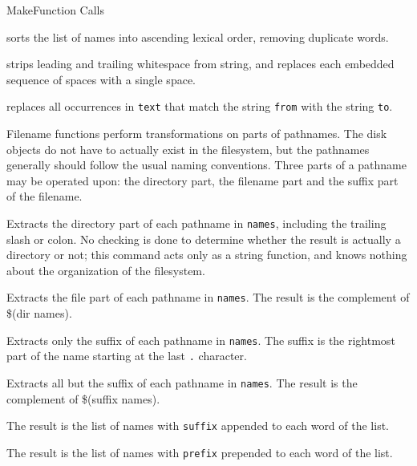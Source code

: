 \begin{manpage}{Make}{Function Calls}{}
\newpage
\separator
{}

sorts the list of names into ascending lexical order, removing duplicate
words.

\separator
{}

strips leading and trailing whitespace from string, and replaces each
embedded sequence of spaces with a single space.

\separator
{}

replaces all occurrences in {\tt text} that match the string {\tt from}
with the string {\tt to}.


\subtitle{Filename Functions}

Filename functions perform transformations on parts of pathnames.  The disk
objects do not have to actually exist in the filesystem, but the pathnames
generally should follow the usual naming conventions.  Three parts of a
pathname may be operated upon:  the directory part, the filename part and
the suffix part of the filename.

\separator
{}

Extracts the directory part of each pathname in {\tt names}, including the
trailing slash or colon.  No checking is done to determine whether the
result is actually a directory or not; this command acts only as a string
function, and knows nothing about the organization of the filesystem.

\separator
{}

Extracts the file part of each pathname in {\tt names}.  The result is the
complement of \$(dir names).

\separator
{}

Extracts only the suffix of each pathname in {\tt names}.  The suffix is
the rightmost part of the name starting at the last {\tt .} character.

\newpage
\separator
{}

Extracts all but the suffix of each pathname in {\tt names}.  The result
is the complement of \$(suffix names).
	
\separator
{}

The result is the list of names with {\tt suffix} appended to each word of
the list.

\separator
{}

The result is the list of names with {\tt prefix} prepended to each word of
the list.


\end{manpage}
